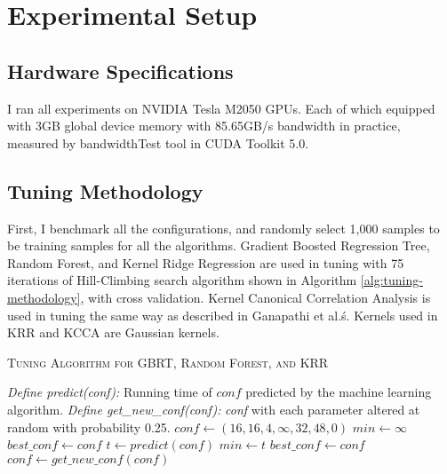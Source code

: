 \section{Experimental Setup}
\subsection{Hardware Specifications}
I ran all experiments on NVIDIA Tesla M2050 GPUs. Each of which equipped with 3GB global device memory with 85.65GB/s bandwidth in practice, measured by bandwidthTest tool in CUDA Toolkit 5.0.

\subsection{Tuning Methodology}
First, I benchmark all the configurations, and randomly select 1,000 samples to be training samples for all the algorithms. Gradient Boosted Regression Tree, Random Forest, and Kernel Ridge Regression are used in tuning with 75 iterations of Hill-Climbing search algorithm shown in Algorithm \ref{alg:tuning-methodology}, with cross validation. Kernel Canonical Correlation Analysis is used in tuning the same way as described in Ganapathi et al.\'s. Kernels used in KRR and KCCA are Gaussian kernels.

\begin{algorithm}
\caption{\textsc{Tuning Algorithm for GBRT, Random Forest, and KRR}}
\label{alg:tuning-methodology}
\begin{algorithmic}[1]
\State \emph{Define \emph{predict(conf)}:} Running time of $conf$ predicted by the machine learning algorithm.
\State \emph{Define \emph{get\_new\_conf(conf)}:} \emph{conf} with each parameter altered at random with probability 0.25.
\State $conf \leftarrow (16,16,4,\infty,32,48,0)$
\State $min \leftarrow \infty$
\State $best\_conf \leftarrow conf$
	\State $t \leftarrow predict(conf)$
		\State $min \leftarrow t$
		\State $best\_conf \leftarrow conf$
	\EndIf
	\State $conf \leftarrow get\_new\_conf(conf)$
\EndFor
\end{algorithmic}
\end{algorithm}

